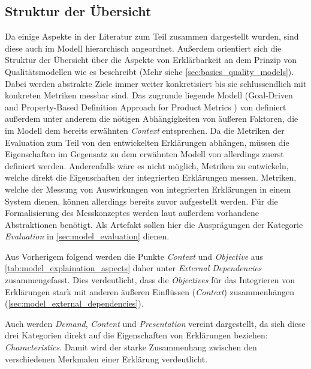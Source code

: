 \subsection{Struktur der Übersicht}

Da einige Aspekte in der Literatur zum Teil zusammen dargestellt wurden, sind diese auch im Modell hierarchisch angeordnet. Außerdem orientiert sich die Struktur der Übersicht über die Aspekte von Erklärbarkeit an dem Prinzip von Qualitätsmodellen wie es \citeauthor{schneider2012abenteuer} beschreibt \cite{schneider2012abenteuer} (Mehr siehe \autoref{sec:basics_quality_models}). Dabei werden abstrakte Ziele immer weiter konkretisiert bis sie schlussendlich mit konkreten Metriken messbar sind. Das zugrunde liegende Modell (\glqq Goal-Driven and Property-Based Definition Approach for Product Metrics\grqq{} \cite{briand1995goal}) von \citeauthor{briand1995goal} definiert außerdem unter anderem die nötigen Abhängigkeiten von äußeren Faktoren, die im Modell dem bereits erwähnten \textit{Context} entsprechen. Da die Metriken der Evaluation zum Teil von den entwickelten Erklärungen abhängen, müssen die Eigenschaften im Gegensatz zu dem erwähnten Modell von \citeauthor{schneider2012abenteuer} allerdings zuerst definiert werden. Anderenfalls wäre es nicht möglich, Metriken zu entwickeln, welche direkt die Eigenschaften der integrierten Erklärungen messen. Metriken, welche der Messung von Auswirkungen von integrierten Erklärungen in einem System dienen, können allerdings bereits zuvor aufgestellt werden. Für die Formalisierung des Messkonzeptes werden laut \citeauthor{briand1995goal} außerdem vorhandene Abstraktionen benötigt. Als Artefakt sollen hier die Ausprägungen der Kategorie \textit{Evaluation} in \autoref{sec:model_evaluation} dienen.

\smallbreak

Aus Vorherigem folgend werden die Punkte \textit{Context} und \textit{Objective} aus \autoref{tab:model_explaination_aspects} daher unter \textit{External Dependencies} zusammengefasst. Dies verdeutlicht, dass die \textit{Objectives} für das Integrieren von Erklärungen stark mit anderen äußeren Einflüssen (\textit{Context}) zusammenhängen (\autoref{sec:model_external_dependencies}).

Auch werden \textit{Demand}, \textit{Content} und \textit{Presentation} vereint dargestellt, da sich diese drei Kategorien direkt auf die Eigenschaften von Erklärungen beziehen: \textit{Characteristics}. Damit wird der starke Zusammenhang zwischen den verschiedenen Merkmalen einer Erklärung verdeutlicht.

